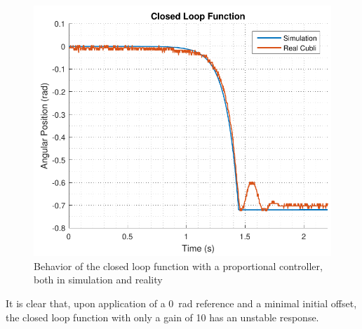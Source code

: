 \begin{figure}[H] 
	\centering 
	\includegraphics[scale=0.75]{figures/closedLoopResponse}	
	\caption{Behavior of the closed loop function with a proportional controller, both in simulation and reality}
	\label{closedLoopResponse}
\end{figure}
%
It is clear that, upon application of a \SI{0}{rad} reference and a minimal initial offset, the closed loop function with only a gain of 10 has an unstable response.
